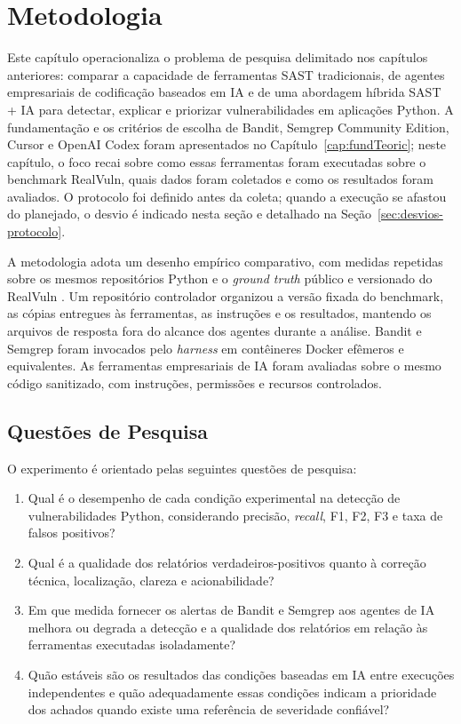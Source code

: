 \chapter{Metodologia}\label{cap:metodologia}

Este capítulo operacionaliza o problema de pesquisa delimitado nos capítulos anteriores: comparar a capacidade de ferramentas SAST tradicionais, de agentes empresariais de codificação baseados em IA e de uma abordagem híbrida SAST + IA para detectar, explicar e priorizar vulnerabilidades em aplicações Python. A fundamentação e os critérios de escolha de Bandit, Semgrep Community Edition, Cursor e OpenAI Codex foram apresentados no Capítulo~\ref{cap:fundTeoric}; neste capítulo, o foco recai sobre como essas ferramentas foram executadas sobre o benchmark RealVuln, quais dados foram coletados e como os resultados foram avaliados. O protocolo foi definido antes da coleta; quando a execução se afastou do planejado, o desvio é indicado nesta seção e detalhado na Seção~\ref{sec:desvios-protocolo}.

A metodologia adota um desenho empírico comparativo, com medidas repetidas sobre os mesmos repositórios Python e o \textit{ground truth} público e versionado do RealVuln \cite{Pellew2026RealVuln}. Um repositório controlador organizou a versão fixada do benchmark, as cópias entregues às ferramentas, as instruções e os resultados, mantendo os arquivos de resposta fora do alcance dos agentes durante a análise. Bandit e Semgrep foram invocados pelo \textit{harness} em contêineres Docker efêmeros e equivalentes. As ferramentas empresariais de IA foram avaliadas sobre o mesmo código sanitizado, com instruções, permissões e recursos controlados.

\section{Questões de Pesquisa}\label{sec:questoes-pesquisa-metodologia}

O experimento é orientado pelas seguintes questões de pesquisa:

\begin{enumerate}
\item[\textbf{QP1}] Qual é o desempenho de cada condição experimental na detecção de vulnerabilidades Python, considerando precisão, \textit{recall}, F1, F2, F3 e taxa de falsos positivos?
\item[\textbf{QP2}] Qual é a qualidade dos relatórios verdadeiros-positivos quanto à correção técnica, localização, clareza e acionabilidade?
\item[\textbf{QP3}] Em que medida fornecer os alertas de Bandit e Semgrep aos agentes de IA melhora ou degrada a detecção e a qualidade dos relatórios em relação às ferramentas executadas isoladamente?
\item[\textbf{QP4}] Quão estáveis são os resultados das condições baseadas em IA entre execuções independentes e quão adequadamente essas condições indicam a prioridade dos achados quando existe uma referência de severidade confiável?
\end{enumerate}

